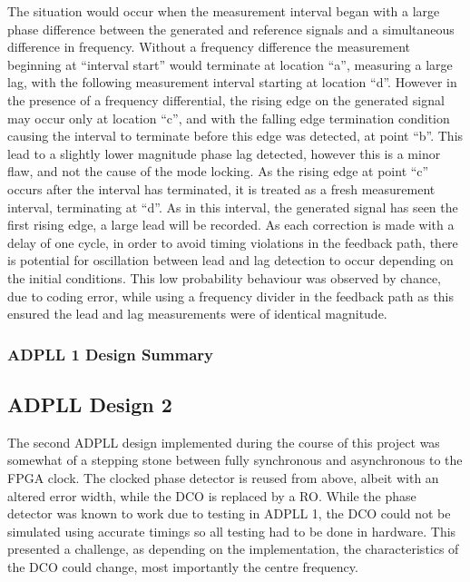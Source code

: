 The situation would occur when the measurement interval began with a large phase difference between the generated and reference signals and a simultaneous difference in frequency. Without a frequency difference the measurement beginning at ``interval start'' would terminate at location ``a'', measuring a large lag, with the following measurement interval starting at location ``d''. However in the presence of a frequency differential, the rising edge on the generated signal may occur only at location ``c'', and with the falling edge termination condition causing the interval to terminate before this edge was detected, at point ``b''. This lead to a slightly lower magnitude phase lag detected, however this is a minor flaw, and not the cause of the mode locking. As the rising edge at point ``c'' occurs after the interval has terminated, it is treated as a fresh measurement interval, terminating at ``d''. As in this interval, the generated signal has seen the first rising edge, a large lead will be recorded. As each correction is made with a delay of one cycle, in order to avoid timing violations in the feedback path, there is potential for oscillation between lead and lag detection to occur depending on the initial conditions. This low probability behaviour was observed by chance, due to coding error, while using a frequency divider in the feedback path as this ensured the lead and lag measurements were of identical magnitude. 

\subsubsection{\acs{ADPLL} 1 Design Summary}

\subsection{\acs{ADPLL} Design 2}
The second \ac{ADPLL} design implemented during the course of this project was somewhat of a stepping stone between fully synchronous and asynchronous to the \ac{FPGA} clock. The clocked phase detector is reused from above, albeit with an altered error width, while the \ac{DCO} is replaced by a \acl{RO}. While the phase detector was known to work due to testing in \ac{ADPLL} 1, the \ac{DCO} could not be simulated using accurate timings so all testing had to be done in hardware. This presented a challenge, as depending on the implementation, the characteristics of the \ac{DCO} could change, most importantly the centre frequency. 

